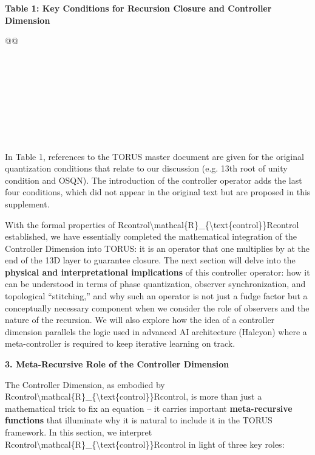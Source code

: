 \documentclass[
]{article}
\begin{document}
\textbf{Table 1: Key Conditions for Recursion Closure and Controller
Dimension}

\begin{longtable}[]{@{}@{}}
\toprule\noalign{}
\endhead
\bottomrule\noalign{}
\endlastfoot
 \\
 \\
 \\
 \\
 \\
 \\
 \\
 \\
 \\
\end{longtable}

In Table 1, references to the TORUS master document are given for the
original quantization conditions that relate to our discussion (e.g.
13th root of unity condition and OSQN). The introduction of the
controller operator adds the last four conditions, which did not appear
in the original text but are proposed in this supplement.

With the formal properties of
Rcontrol\textbackslash mathcal\{R\}\_\{\textbackslash text\{control\}\}Rcontrol\hspace{0pt}
established, we have essentially completed the mathematical integration
of the Controller Dimension into TORUS: it is an operator that one
multiplies by at the end of the 13D layer to guarantee closure. The next
section will delve into the \textbf{physical and interpretational
implications} of this controller operator: how it can be understood in
terms of phase quantization, observer synchronization, and topological
``stitching,'' and why such an operator is not just a fudge factor but a
conceptually necessary component when we consider the role of observers
and the nature of the recursion. We will also explore how the idea of a
controller dimension parallels the logic used in advanced AI
architecture (Halcyon) where a meta-controller is required to keep
iterative learning on track.

\textbf{3. Meta-Recursive Role of the Controller Dimension}

The Controller Dimension, as embodied by
Rcontrol\textbackslash mathcal\{R\}\_\{\textbackslash text\{control\}\}Rcontrol\hspace{0pt},
is more than just a mathematical trick to fix an equation -- it carries
important \textbf{meta-recursive functions} that illuminate why it is
natural to include it in the TORUS framework. In this section, we
interpret
Rcontrol\textbackslash mathcal\{R\}\_\{\textbackslash text\{control\}\}Rcontrol\hspace{0pt}
in light of three key roles:
\end{document}
